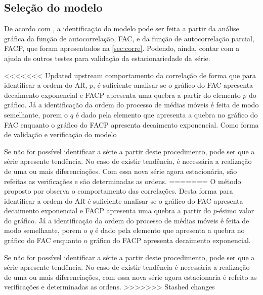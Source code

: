 \documentclass[
    12pt,
    oneside,
    a4paper,
    english,
    brazil
]{abntex2}
\begin{document}
\subsection{Seleção do modelo}

De acordo  com ,  a identificação  do modelo  pode ser  feita a
partir da  análise gráfica  da função  de autocorrelação, FAC,  e da  função de
autocorrelação parcial,  FACP, que  foram apresentados  na \autoref{sec:corre}.
Podendo,  ainda,  contar  com  a  ajuda de  outros  testes  para  validação  da
estacionariedade da série.

<<<<<<< Updated upstream
comportamento da correlação de forma que para identificar a ordem do AR, $p$, é
suficiente analisar se o gráfico do FAC apresenta decaimento exponencial e FACP
apresenta uma quebra a partir do elemento $p$ do gráfico. Já a identificação da
ordem do processo  de médias móveis é  feita de modo semelhante, porem  o $q$ é
dado pela elemento que apresenta a quebra  no gráfico do FAC enquanto o gráfico
do FACP  apresenta decaimento  exponencial. Como forma de validação e
verificação do modelo

Se não for  possível identificar a série a partir  deste procedimento, pode ser
que a  série apresente  tendência. No  caso de  existir tendência, é necessária
a  realização  de  uma  ou  mais diferenciações.  Com  essa  nova  série  agora
estacionária, são refeitas as verificações e são determinadas as ordens.
=======
O método proposto por  observa o comportamento das correlações.
Desta forma para identificar  a ordem do AR é suficiente  analisar se o gráfico
do FAC apresenta decaimento exponencial e FACP apresenta uma quebra a partir do
$p$-ésimo valor do  gráfico. Já a identificação da ordem  do processo de médias
móveis  é feita  de modo  semelhante,  porem o  $q$  é dado  pela elemento  que
apresenta  a quebra  no gráfico  do FAC  enquanto o  gráfico do  FACP apresenta
decaimento exponencial.

Se não for  possível identificar a série a partir  deste procedimento, pode ser
que a  série apresente  tendência. No  caso de  existir tendência  é necessária
a  realização  de  uma  ou  mais diferenciações,  com  essa  nova  série  agora
estacionaria é refeito as verificações e determinadas as ordens.
>>>>>>> Stashed changes

\end{document}
